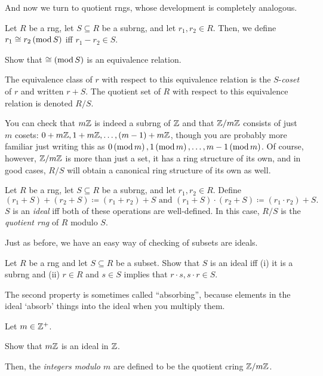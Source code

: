 And now we turn to quotient rngs, whose development is completely analogous.
\begin{dfn}
Let $R$ be a rng, let $S\subseteq R$ be a subrng, and let $r_1,r_2\in R$.  Then, we define $r_1\cong r_2\left( \mathrm{mod}\, S\right)$ iff $r_1-r_2\in S$.
\begin{exr}
Show that $\cong \left( \mathrm{mod}\, S\right)$ is an equivalence relation.
\end{exr}
The equivalence class of $r$ with respect to this equivalence relation is the $S$-\emph{coset} of $r$ and written $r+S$.  The quotient set of $R$ with respect to this equivalence relation is denoted $R/S$.
\end{dfn}
You can check that $m\mathbb{Z}$ is indeed a subrng of $\mathbb{Z}$ and that $\mathbb{Z} /m\mathbb{Z}$ consists of just $m$ cosets:  $0+m\mathbb{Z} ,1+m\mathbb{Z} ,\ldots ,(m-1)+m\mathbb{Z}$, though you are probably more familiar just writing this as $0\left( \mathrm{mod}\, m\right),1\left( \mathrm{mod}\, m\right),\ldots ,m-1\left( \mathrm{mod}\, m\right)$.  Of course, however, $\mathbb{Z} /m\mathbb{Z}$ is more than just a set, it has a ring structure of its own, and in good cases, $R/S$ will obtain a canonical ring structure of its own as well.
\begin{dfn}\label{IdealsAndQuotientRngs}
Let $R$ be a rng, let $S\subseteq R$ be a subrng, and let $r_1,r_2\in R$.  Define
\begin{equation}
(r_1+S)+(r_2+S)\coloneqq (r_1+r_2)+S\text{ and }(r_1+S)\cdot (r_2+S)\coloneqq (r_1\cdot r_2)+S.
\end{equation}
$S$ is an \emph{ideal} iff both of these operations are well-defined.  In this case, $R/S$ is the \emph{quotient rng} of $R$ modulo $S$.
\end{dfn}
Just as before, we have an easy way of checking of subsets are ideals.
\begin{exr}
Let $R$ be a rng and let $S\subseteq R$ be a subset.  Show that $S$ is an ideal iff (i) it is a subrng and (ii) $r\in R$ and $s\in S$ implies that $r\cdot s,s\cdot r\in S$.
\begin{rmk}
The second property is sometimes called ``absorbing'', because elements in the ideal `absorb' things into the ideal when you multiply them.
\end{rmk}
\end{exr}
\begin{exm}\label{exmA.1.117}
Let $m\in \mathbb{Z} ^+$.
\begin{exr}
Show that $m\mathbb{Z}$ is an ideal in $\mathbb{Z}$.
\end{exr}
Then, the \emph{integers modulo $m$} are defined to be the quotient cring $\mathbb{Z} /m\mathbb{Z}$.
\end{exm}

